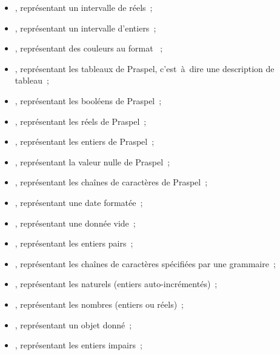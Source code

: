 \begin{enumerate}[couche 1]
\begin{itemize}
    \item {}, représentant un intervalle de réels~;

    \item {}, représentant un intervalle d'entiers~;

    \item {}, représentant des couleurs au format ~;

    \item {}, représentant les tableaux de Praspel, c'est~à~dire
    une description de tableau~;

    \item {}, représentant les booléens de Praspel~;

    \item {}, représentant les réels de Praspel~;

    \item {}, représentant les entiers de Praspel~;

    \item {}, représentant la valeur nulle de Praspel~;

    \item {}, représentant les chaînes de caractères de
    Praspel~;

    \item {}, représentant une date formatée~;

    \item {}, représentant une donnée vide~;

    \item {}, représentant les entiers pairs~;

    \item {}, représentant les chaînes de caractères spécifiées par
    une grammaire~;

    \item {}, représentant les naturels (entiers auto-incrémentés)~;

    \item {}, représentant les nombres (entiers ou réels)~;

    \item {}, représentant un objet donné~;

    \item {}, représentant les entiers impairs~;


\end{itemize}
\end{enumerate}
